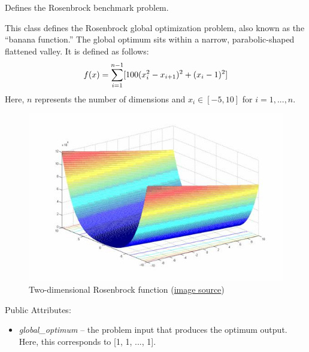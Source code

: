 \documentclass[letterpaper,10pt,english]{sphinxmanual}
\begin{document}

\begin{fulllineitems}
\label{reference:inspyred.benchmarks.Rosenbrock}
Defines the Rosenbrock benchmark problem.

This class defines the Rosenbrock global optimization problem, 
also known as the ``banana function.'' The global optimum sits 
within a narrow, parabolic-shaped flattened valley. It is 
defined as follows:
\begin{gather}
\begin{split}f(x) = \sum_{i=1}^{n-1} [100(x_i^2 - x_{i+1})^2 + (x_i - 1)^2]\end{split}\notag
\end{gather}
Here, $n$ represents the number of dimensions and $x_i \in [-5, 10]$ for $i=1,...,n$.
\begin{figure}[htbp]
\centering
\capstart

\includegraphics{image12371.jpg}
\caption{Two-dimensional Rosenbrock function 
(\href{http://www-optima.amp.i.kyoto-u.ac.jp/member/student/hedar/Hedar\_files/TestGO\_files/Page2537.htm}{image source})}\end{figure}

Public Attributes:
\begin{itemize}
\item {} 
\emph{global\_optimum} -- the problem input that produces the optimum output.
Here, this corresponds to {[}1, 1, ..., 1{]}.

\end{itemize}

\end{fulllineitems}
\end{document}
